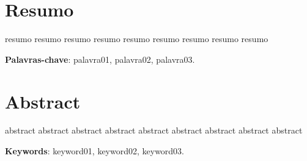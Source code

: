 \chapter{Resumo}
resumo resumo resumo
resumo resumo resumo
resumo resumo resumo

\vspace{.5cm}
\textbf{Palavras-chave}:
palavra01, palavra02, palavra03.

\chapter{Abstract}
abstract abstract abstract
abstract abstract abstract
abstract abstract abstract

\vspace{.5cm}
\textbf{Keywords}:
keyword01, keyword02, keyword03.
